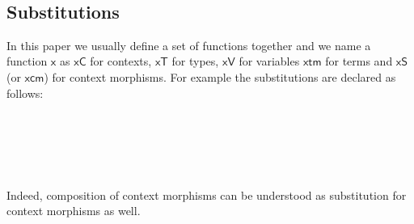 \documentclass{acm_proc_article-sp}
\begin{document}
{\begin{code}
\\
\>[0]\<[8]%
\>[8]\AgdaSymbol{(} \AgdaSymbol{:} \AgdaSymbol{\{} \AgdaSymbol{:}  \AgdaSymbol{\}}      \AgdaSymbol{(} \AgdaSymbol{))}  \<[45]%
\>[45]\<%
\\
\>[0]\<[8]%
\>[8]   \<[14]%
\>[14]\<%
\\
\>[0]\<[6]%
\>[6]     \<%
\\
\>  \AgdaSymbol{(} \AgdaSymbol{\_)} \AgdaSymbol{=}  \AgdaSymbol{\_}\<%
\\
%
\\
\>\<\end{code}
}


\subsection{Substitutions}

In this paper we usually define a set of functions together and
we name a function $\mathsf{x}$ as $\mathsf{xC}$ for contexts, $\mathsf{xT}$ for types, $\mathsf{xV}$ for
variables $\mathsf{xtm}$ for terms and $\mathsf{xS}$ (or $\mathsf{xcm}$) for context morphisms. For example
the substitutions are declared as follows:

\begin{code}\>\<%
\\
\> \<[8]%
\>[8]\AgdaSymbol{:}  \AgdaSymbol{\}}          \<%
\\
\> \<[8]%
\>[8]\AgdaSymbol{:}   \AgdaSymbol{\}}     \AgdaSymbol{(} \AgdaSymbol{:}   \AgdaSymbol{)}   \AgdaSymbol{(} \AgdaFunction{[}  \AgdaFunction{]T}\AgdaSymbol{)}\<%
\\
\> \<[8]%
\>[8]\AgdaSymbol{:}   \AgdaSymbol{\}}     \AgdaSymbol{(} \AgdaSymbol{:}   \AgdaSymbol{)}   \AgdaSymbol{(} \AgdaFunction{[}  \AgdaFunction{]T}\AgdaSymbol{)} \<[59]%
\>[59]\<%
\\
\>\<\end{code}
Indeed, composition of context morphisms can be understood as substitution for context morphisms as well.
\end{document}
